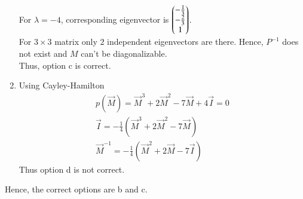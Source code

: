 \documentclass[journal,12pt,twocolumn]{IEEEtran}
\begin{document}
\begin{enumerate}
{For $\lambda=-4$, corresponding eigenvector is $\begin{pmatrix}-\frac{1}{3}\\-\frac{2}{3}\\1\end{pmatrix}$.\\
For $3\times3$ matrix only $2$ independent eigenvectors are there. Hence, $P^{-1}$ does not exist and $M$ can't be diagonalizable.\\
Thus, option c is correct.}\\
\item{ Using Cayley-Hamilton
\begin{align}
p(\vec{M})= \vec{M}^3+2\vec{M}^2-7\vec{M}+4\vec{I}=0\\
\vec{I}= -\frac{1}{4}(\vec{M}^3+2\vec{M}^2-7\vec{M})\\
\vec{M}^{-1}=-\frac{1}{4}(\vec{M}^2+2\vec{M}-7\vec{I})
\end{align}
Thus option d is not correct.\\}
\end{enumerate}
Hence, the correct options are b and c.
\end{document}
